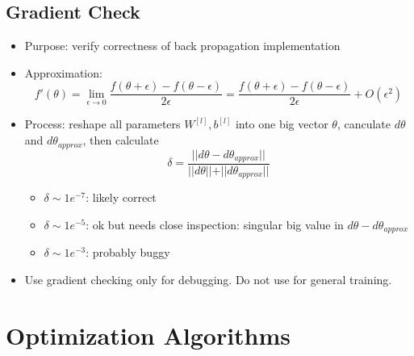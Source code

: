 \subsection{Gradient Check}
\begin{itemize}
  \item Purpose: verify correctness of back propagation implementation
  \item Approximation: \[f'(\theta)=\displaystyle\lim_{\epsilon\rightarrow 0}\frac{f(\theta+\epsilon)-f(\theta-\epsilon)}{2\epsilon}=\frac{f(\theta+\epsilon)-f(\theta-\epsilon)}{2\epsilon}+O(\epsilon^2)\]
  \item Process: reshape all parameters $W^{[l]}, b^{[l]}$ into one big vector $\theta$, canculate $d\theta$ and $d\theta_{approx}$, then calculate
  \[\delta=\frac{\vert\vert d\theta-d\theta_{approx}\vert\vert}{\vert\vert d\theta\vert\vert+\vert\vert d\theta_{approx}\vert\vert}\]
  \begin{itemize}
    \item $\delta\sim 1e^{-7}$: likely correct
    \item $\delta\sim 1e^{-5}$: ok but needs close inspection: singular big value in $d\theta-d\theta_{approx}$
    \item $\delta\sim 1e^{-3}$: probably buggy 
  \end{itemize}
  \item Use gradient checking only for debugging. Do not use for general training. 
\end{itemize}
\section{Optimization Algorithms}
